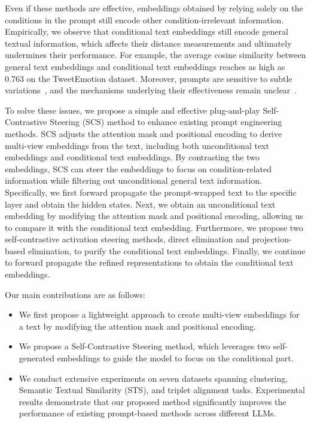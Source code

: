 \documentclass[11pt]{article}
\begin{document}
Even if these methods are effective, embeddings obtained by relying solely on the conditions in the prompt still encode other condition-irrelevant information.
Empirically, we observe that conditional text embeddings still encode general textual information, which affects their distance measurements and ultimately undermines their performance.
For example, the average cosine similarity between general text embeddings and conditional text embeddings reaches as high as 0.763 on the TweetEmotion dataset.
Moreover, prompts are sensitive to subtle variations~\cite{DBLP:conf/acl/LuBM0S22}, and the mechanisms underlying their effectiveness remain unclear~\cite{DBLP:conf/icml/ShiWXL24}.

To solve these issues, we propose a simple and effective plug-and-play Self-Contrastive Steering (SCS) method to enhance existing prompt engineering methods.
SCS adjusts the attention mask and positional encoding to derive multi-view embeddings from the text, including both unconditional text embeddings and conditional text embeddings.
By contrasting the two embeddings, SCS can steer the embeddings to focus on condition-related information while filtering out unconditional general text information.
Specifically, we first forward propagate the prompt-wrapped text to the specific layer and obtain the hidden states.
Next, we obtain an unconditional text embedding by modifying the attention mask and positional encoding, allowing us to compare it with the conditional text embedding.
Furthermore, we propose two self-contrastive activation steering methods, direct elimination and projection-based elimination, to purify the conditional text embeddings.
Finally, we continue to forward propagate the refined representations to obtain the conditional text embeddings.



Our main contributions are as follows:
\begin{itemize}
\item We first propose a lightweight approach to create multi-view embeddings for a text by modifying the attention mask and positional encoding.
\item We propose a Self-Contrastive Steering method, which leverages two self-generated embeddings to guide the model to focus on the conditional part.
\item We conduct extensive experiments on seven datasets spanning clustering, Semantic Textual Similarity (STS), and triplet alignment tasks. Experimental results demonstrate that our proposed method significantly improves the performance of existing prompt-based methods across different LLMs.
\end{itemize}
\end{document}
